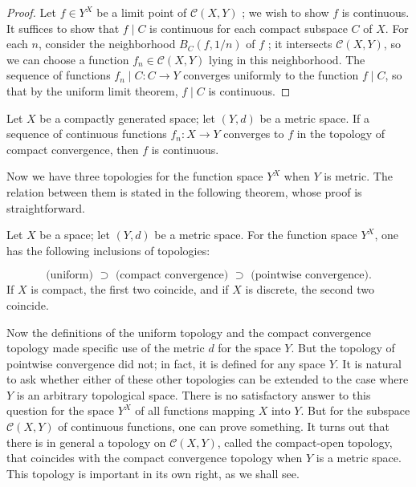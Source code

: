 \begin{proof}
Let \(f \in {Y}^{X}\) be a limit point of \(\mathcal{C}({X,Y})\) ; we wish to show \(f\) is continuous. It suffices to show that \(f \mid C\) is continuous for each compact subspace \(C\) of \(X\). For each \(n\), consider the neighborhood \(B_{C}({f,1/n})\) of \(f\) ; it intersects \(\mathcal{C}({X,Y})\), so we can choose a function \(f_{n} \in \mathcal{C}({X,Y})\) lying in this neighborhood. The sequence of functions \(f_{n} \mid C : C \rightarrow Y\) converges uniformly to the function \(f \mid C\), so that by the uniform limit theorem, \(f \mid C\) is continuous.
\end{proof}
\begin{corollary}
\label{cor:\thetheorem}
Let \(X\) be a compactly generated space; let \((Y, d)\) be a metric space. If a sequence of continuous functions \(f_{n} : X \rightarrow Y\) converges to \(f\) in the topology of compact convergence, then \(f\) is continuous.
\end{corollary}

Now we have three topologies for the function space \(Y^{X}\) when \(Y\) is metric. The relation between them is stated in the following theorem, whose proof is straightforward.

\begin{theorem}
\label{thm:\thetheorem}
Let \(X\) be a space; let \((Y, d)\) be a metric space. For the function space \(Y^{X}\), one has the following inclusions of topologies:
\end{theorem}

\[
\text{ (uniform) } \supset \text{ (compact convergence) } \supset \text{ (pointwise convergence). }
\]
If \(X\) is compact, the first two coincide, and if \(X\) is discrete, the second two coincide.

Now the definitions of the uniform topology and the compact convergence topology made specific use of the metric \(d\) for the space \(Y\). But the topology of pointwise convergence did not; in fact, it is defined for any space \(Y\). It is natural to ask whether either of these other topologies can be extended to the case where \(Y\) is an arbitrary topological space. There is no satisfactory answer to this question for the space \(Y^{X}\) of all functions mapping \(X\) into \(Y\). But for the subspace \(\mathcal{C}({X,Y})\) of continuous functions, one can prove something. It turns out that there is in general a topology on \(\mathcal{C}({X,Y})\), called the compact-open topology, that coincides with the compact convergence topology when \(Y\) is a metric space. This topology is important in its own right, as we shall see.

